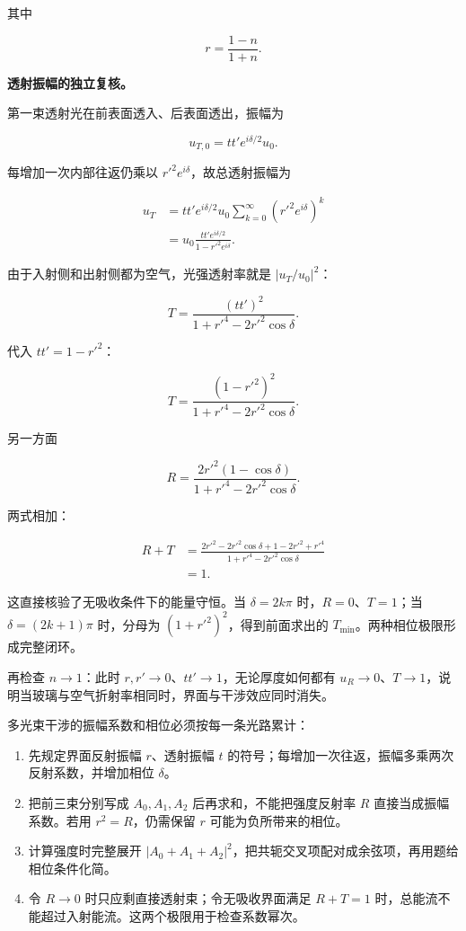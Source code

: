 \documentclass[12pt,a4paper,UTF8]{ctexart}
\newcommand{\tightlist}{\setlength{\itemsep}{0pt}\setlength{\parskip}{0pt}}
\begin{document}
其中

\[r=\frac{1-n}{1+n}.\]

\textbf{透射振幅的独立复核。}

第一束透射光在前表面透入、后表面透出，振幅为

\[u_{T,0}=tt'e^{i\delta/2}u_0.\]

每增加一次内部往返仍乘以 \(r'^2e^{i\delta}\)，故总透射振幅为

\[
\begin{aligned}
u_T
&=tt'e^{i\delta/2}u_0
\sum_{k=0}^{\infty}(r'^2e^{i\delta})^k\\
&=u_0\frac{tt'e^{i\delta/2}}{1-r'^2e^{i\delta}}.
\end{aligned}
\]

由于入射侧和出射侧都为空气，光强透射率就是 \(|u_T/u_0|^2\)：

\[T=\frac{(tt')^2}{1+r'^4-2r'^2\cos\delta}.\]

代入 \(tt'=1-r'^2\)：

\[T=\frac{(1-r'^2)^2}{1+r'^4-2r'^2\cos\delta}.\]

另一方面

\[R=\frac{2r'^2(1-\cos\delta)}{1+r'^4-2r'^2\cos\delta}.\]

两式相加：

\[
\begin{aligned}
R+T
&=\frac{2r'^2-2r'^2\cos\delta+1-2r'^2+r'^4}
{1+r'^4-2r'^2\cos\delta}\\
&=1.
\end{aligned}
\]

这直接核验了无吸收条件下的能量守恒。当 \(\delta=2k\pi\)
时，\(R=0\)、\(T=1\)；当 \(\delta=(2k+1)\pi\) 时，分母为
\((1+r'^2)^2\)，得到前面求出的 \(T_{\min}\)。两种相位极限形成完整闭环。

再检查 \(n\to1\)：此时 \(r,r'\to0\)、\(tt'\to1\)，无论厚度如何都有
\(u_R\to0\)、\(T\to1\)，说明当玻璃与空气折射率相同时，界面与干涉效应同时消失。

多光束干涉的振幅系数和相位必须按每一条光路累计：

\begin{enumerate}
\def\labelenumi{\arabic{enumi}.}
\tightlist
\item
  先规定界面反射振幅 \(r\)、透射振幅 \(t\)
  的符号；每增加一次往返，振幅多乘两次反射系数，并增加相位 \(\delta\)。
\item
  把前三束分别写成 \(A_0,A_1,A_2\) 后再求和，不能把强度反射率 \(R\)
  直接当成振幅系数。若用 \(r^2=R\)，仍需保留 \(r\)
  可能为负所带来的相位。
\item
  计算强度时完整展开
  \(|A_0+A_1+A_2|^2\)，把共轭交叉项配对成余弦项，再用题给相位条件化简。
\item
  令 \(R\to0\) 时只应剩直接透射束；令无吸收界面满足 \(R+T=1\)
  时，总能流不能超过入射能流。这两个极限用于检查系数幂次。
\end{enumerate}
\end{document}
